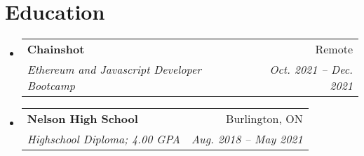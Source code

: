 \documentclass[letterpaper,11pt]{article}
\makeatletter
\newcommand{\resumeSubheading}[4]{
  \vspace{-2pt}\item
    \begin{tabular*}{0.97\textwidth}[t]{l@{\extracolsep{\fill}}r}
      \textbf{#1} & #2 \\
      \textit{\small#3} & \textit{\small #4} \\
    \end{tabular*}\vspace{-7pt}
}
\newcommand{\resumeSubHeadingListStart}{\begin{itemize}[leftmargin=0.15in, label={}]}
\newcommand{\resumeSubHeadingListEnd}{\end{itemize}}
\makeatother
\begin{document}
\section{Education}
\resumeSubHeadingListStart
  \resumeSubheading
    {Chainshot}{Remote}
    {Ethereum and Javascript Developer Bootcamp}{Oct. 2021 -- Dec. 2021}
  \resumeSubheading
    {Nelson High School}{Burlington, ON}
    {Highschool Diploma; 4.00 GPA}{Aug. 2018 -- May 2021}
\resumeSubHeadingListEnd

\end{document}
